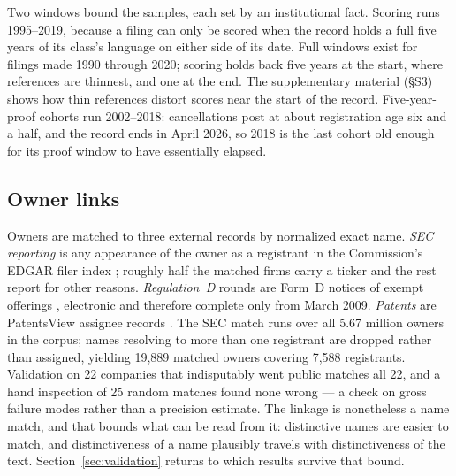 Two windows bound the samples, each set by an institutional fact.
Scoring runs 1995--2019, because a filing can only be scored when the
record holds a full five years of its class's language on either side of
its date. Full windows exist for filings made 1990 through 2020; scoring
holds back five years at the start, where references are thinnest, and
one at the end. The supplementary
material (\S S3) shows how thin references distort scores near the
start of the record. Five-year-proof
cohorts run 2002--2018: cancellations post at about registration age six
and a half, and the record ends in April 2026, so 2018 is the last
cohort old enough for its proof window to have essentially elapsed.

\subsection{Owner links}\label{sec:links}

Owners are matched to three external records by normalized exact name.
\emph{SEC reporting} is any appearance of the owner as a registrant in
the Commission's EDGAR filer index \citep{SECfsds, SECtickers}; roughly
half the matched firms carry a ticker and the rest report for other
reasons. \emph{Regulation~D} rounds are Form~D notices of exempt
offerings \citep{SECformd}, electronic and therefore complete only from
March 2009. \emph{Patents} are PatentsView assignee
records \citep{PatentsView}. The SEC match runs over all 5.67 million
owners in the corpus; names resolving to more than one registrant are
dropped rather than assigned, yielding 19{,}889 matched owners covering
7{,}588 registrants. Validation on 22 companies that indisputably went
public matches all 22, and a hand inspection of 25 random matches found
none wrong --- a check on gross failure modes rather than a precision
estimate. The linkage is nonetheless a name match, and that bounds what
can be read from it: distinctive names are easier to match, and
distinctiveness of a name plausibly travels with distinctiveness of the
text. Section~\ref{sec:validation} returns to which results survive
that bound.
